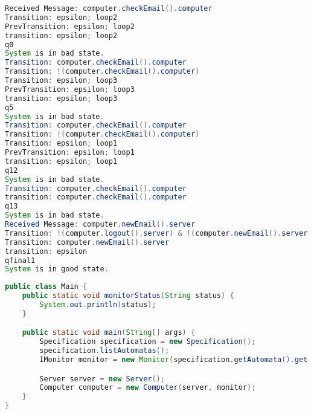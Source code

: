 \begin{lstlisting}[language=java, frame=single, float=ht!, caption={F.2.4. scenariohoz tartozó monitor kimenet.},captionpos=b]
Received Message: computer.checkEmail().computer
Transition: epsilon; loop2
PrevTransition: epsilon; loop2
transition: epsilon; loop2
q0
System is in bad state.
Transition: computer.checkEmail().computer
Transition: !(computer.checkEmail().computer)
Transition: epsilon; loop3
PrevTransition: epsilon; loop3
transition: epsilon; loop3
q5
System is in bad state.
Transition: computer.checkEmail().computer
Transition: !(computer.checkEmail().computer)
Transition: epsilon; loop1
PrevTransition: epsilon; loop1
transition: epsilon; loop1
q12
System is in bad state.
Transition: computer.checkEmail().computer
transition: computer.checkEmail().computer
q13
System is in bad state.
Received Message: computer.newEmail().server
Transition: !(computer.logout().server) & !(computer.newEmail().server)
Transition: computer.newEmail().server
transition: epsilon
qfinal1
System is in good state.
\end{lstlisting}

\begin{lstlisting}[language=java, frame=single, float=ht!, caption={F.2.4. scenariohoz tartozó Main osztály.},captionpos=b]
public class Main {
	public static void monitorStatus(String status) {
		System.out.println(status);
	}

	public static void main(String[] args) {
		Specification specification = new Specification();
		specification.listAutomatas();
		IMonitor monitor = new Monitor(specification.getAutomata().get(0));

		Server server = new Server();
		Computer computer = new Computer(server, monitor);
	}
}
\end{lstlisting}
